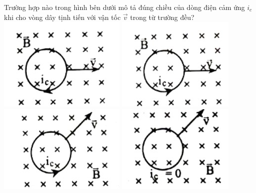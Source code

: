 \begin{ex}
	Trường hợp nào trong hình bên dưới mô tả đúng chiều của dòng điện cảm ứng $i_c$ khi cho vòng dây tịnh tiến với vận tốc $\vec{v}$ trong từ trường đều?
	\choice
	{\includegraphics[width=0.4\linewidth]{figs/VN12-Y24-PH-SYL-020P-14a}}
	{\includegraphics[width=0.4\linewidth]{figs/VN12-Y24-PH-SYL-020P-14b}}
	{\includegraphics[width=0.4\linewidth]{figs/VN12-Y24-PH-SYL-020P-14c}}
	{\True \includegraphics[width=0.4\linewidth]{figs/VN12-Y24-PH-SYL-020P-14d}}
	\loigiai{}
\end{ex}

